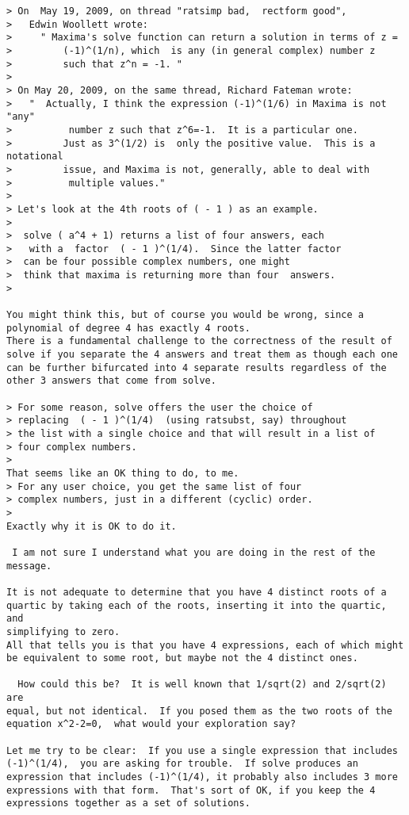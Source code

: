 \documentclass[12pt]{article}
\begin{document}
\begin{verbatim}
> On  May 19, 2009, on thread "ratsimp bad,  rectform good",
>   Edwin Woollett wrote:
>     " Maxima's solve function can return a solution in terms of z = 
>         (-1)^(1/n), which  is any (in general complex) number z   
>         such that z^n = -1. "
>
> On May 20, 2009, on the same thread, Richard Fateman wrote:
>   "  Actually, I think the expression (-1)^(1/6) in Maxima is not "any" 
>          number z such that z^6=-1.  It is a particular one.
>         Just as 3^(1/2) is  only the positive value.  This is a notational 
>         issue, and Maxima is not, generally, able to deal with
>          multiple values."
>
> Let's look at the 4th roots of ( - 1 ) as an example.
>
>  solve ( a^4 + 1) returns a list of four answers, each
>   with a  factor  ( - 1 )^(1/4).  Since the latter factor
>  can be four possible complex numbers, one might
>  think that maxima is returning more than four  answers.
>   

You might think this, but of course you would be wrong, since a 
polynomial of degree 4 has exactly 4 roots.
There is a fundamental challenge to the correctness of the result of 
solve if you separate the 4 answers and treat them as though each one 
can be further bifurcated into 4 separate results regardless of the 
other 3 answers that come from solve.

> For some reason, solve offers the user the choice of
> replacing  ( - 1 )^(1/4)  (using ratsubst, say) throughout 
> the list with a single choice and that will result in a list of
> four complex numbers.
>   
That seems like an OK thing to do, to me.
> For any user choice, you get the same list of four
> complex numbers, just in a different (cyclic) order.
>   
Exactly why it is OK to do it.

 I am not sure I understand what you are doing in the rest of the message. 

It is not adequate to determine that you have 4 distinct roots of a 
quartic by taking each of the roots, inserting it into the quartic, and 
simplifying to zero.
All that tells you is that you have 4 expressions, each of which might 
be equivalent to some root, but maybe not the 4 distinct ones.

  How could this be?  It is well known that 1/sqrt(2) and 2/sqrt(2) are 
equal, but not identical.  If you posed them as the two roots of the 
equation x^2-2=0,  what would your exploration say?

Let me try to be clear:  If you use a single expression that includes 
(-1)^(1/4),  you are asking for trouble.  If solve produces an 
expression that includes (-1)^(1/4), it probably also includes 3 more 
expressions with that form.  That's sort of OK, if you keep the 4 
expressions together as a set of solutions.


\end{verbatim}
\end{document}
